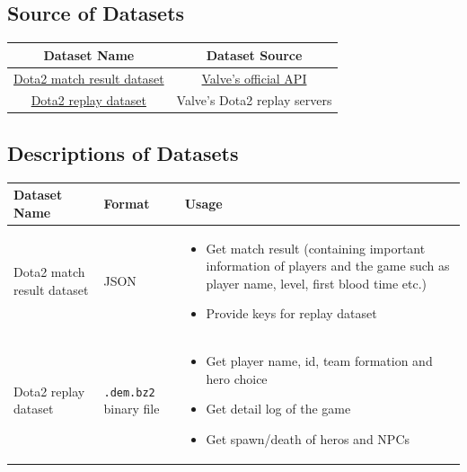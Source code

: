 \documentclass{article}
\newcommand{\codeinline}[1]{
	\texttt{#1}
}
\begin{document}
\subsection{Source of Datasets}

\begin{center}
    \begin{tabular}{|c|c|}
    \hline
    Dataset Name & Dataset Source \\
    \hline\hline
    \href{https://wiki.teamfortress.com/wiki/WebAPI/GetMatchDetails}{Dota2 match result dataset} & \href{https://wiki.teamfortress.com/wiki/WebAPI}{Valve's official API} \\
    \hline
    \href{https://wiki.teamfortress.com/wiki/Replay}{Dota2 replay dataset} & Valve's Dota2 replay servers \\
    \hline
    \end{tabular}
\end{center}

\subsection{Descriptions of Datasets}

\begin{center}
    \begin{tabular}{|p{4.5cm}|p{3.5cm}|p{5cm}|}
    \hline
    Dataset Name & Format & Usage \\
    \hline\hline
    Dota2 match result dataset & JSON & \begin{itemize}
        \item Get match result (containing important information of players and the game such as player name, level, first blood time etc.)
        \item Provide keys for replay dataset
    \end{itemize} \\
    \hline
    Dota2 replay dataset & \codeinline{.dem.bz2} binary file & \begin{itemize}
        \item Get player name, id, team formation and hero choice
        \item Get detail log of the game
        \item Get spawn/death of heros and NPCs
    \end{itemize} \\
    \hline
    \end{tabular}
\end{center}
\end{document}
